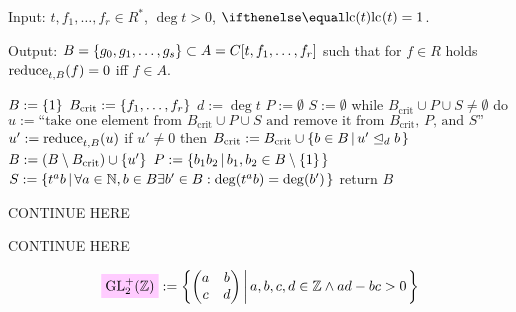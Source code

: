 \documentclass{article}
\begin{document}
\noindent
Input: $t, f_1, \ldots, f_r \in R^*$, $\deg t > 0$, $\lc t = 1$.

\noindent
Output:
$B = \Set{g_0, g_1, \ldots, g_s} \subset A= C[t, f_1, \ldots, f_r]$
such that for $f\in R$ holds $\applyReduce{f}{t}{B} = 0$ iff
$f \in A$.
\begin{pseudoalgorithm}
$B := \Set{1}$
$B_{\mathrm{crit}} := \Set{f_1, \ldots, f_r}$
$d := \deg t$
$P := \emptyset$
$S := \emptyset$
while $B_{\mathrm{crit}} \cup P \cup S \neq \emptyset$ do
    $u := \textrm{``take one element from }B_{\mathrm{crit}} \cup P \cup S\textrm{ and remove it from }B_{\mathrm{crit}}\textrm{, }P\textrm{, and }S\textrm{''}$
    $u' := \applyReduce{u}{t}{B}\label{algo:samba-reduce}$
    if $u' \neq 0$ then
        $B_{\mathrm{crit}} := B_{\mathrm{crit}} \cup \SetDef{b\in B}{\dividesMod[d]{u'}{b}}$
        $B := (B \setminus B_{\mathrm{crit}}) \cup \Set{u'}\label{algo:samba-add}$
        $P := \SetDef{b_1b_2}{b_1,b_2\in B\setminus\Set{1}}$
        $S := \SetDef{t^ab}{\forall a\in\setN,b\in B \exists b'\in B: \deg(t^ab)=\deg(b')}\label{algo:samba-gap}$
return $B$
\end{pseudoalgorithm}


\begin{Hemmecke}
  CONTINUE HERE
\end{Hemmecke}
\begin{Hemmecke}
  CONTINUE HERE
\end{Hemmecke}



\begin{Hemmecke}
\begin{gather}
  \defineNotation[GL2+Z]{\mathrm{GL}_2^+(\setZ)}
  :=
  \SetDef{  \begin{pmatrix}
    a & b\\
    c & d
  \end{pmatrix}}{a,b,c,d\in\setZ \land ad-bc>0}
  \label{eq:GL2+Z}
\end{gather}
\end{Hemmecke}
\end{document}
